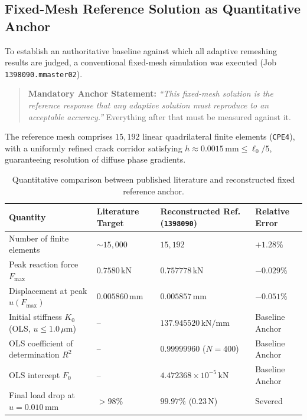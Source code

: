 \subsection{Fixed-Mesh Reference Solution as Quantitative Anchor}
To establish an authoritative baseline against which all adaptive remeshing results are judged, a conventional fixed-mesh simulation was executed (Job \texttt{1398090.mmaster02}). 

\begin{quote}
\textbf{Mandatory Anchor Statement:} \emph{``This fixed-mesh solution is the reference response that any adaptive solution must reproduce to an acceptable accuracy.''} Everything after that must be measured against it.
\end{quote}

The reference mesh comprises $15{,}192$ linear quadrilateral finite elements (\texttt{CPE4}), with a uniformly refined crack corridor satisfying $h \approx 0.0015\,\mathrm{mm} \le \ell_0 / 5$, guaranteeing resolution of diffuse phase gradients. 

\begin{table}[htbp]
  \centering
  \footnotesize
  \caption{Quantitative comparison between published literature and reconstructed fixed reference anchor.}
  \label{tab:reference_anchor}
  \begin{tabularx}{\textwidth}{L{46mm} C{28mm} C{28mm} C{24mm}}
    \toprule
    \textbf{Quantity} & \textbf{Literature Target} \citep{Pandey2025} & \textbf{Reconstructed Ref.} (\texttt{1398090}) & \textbf{Relative Error} \\
    \midrule
    Number of finite elements & $\sim 15{,}000$ & $15{,}192$ & $+1.28\%$ \\
    Peak reaction force $F_{\max}$ & $0.7580\,\mathrm{kN}$ & $0.757778\,\mathrm{kN}$ & $-0.029\%$ \\
    Displacement at peak $u(F_{\max})$ & $0.005860\,\mathrm{mm}$ & $0.005857\,\mathrm{mm}$ & $-0.051\%$ \\
    Initial stiffness $K_0$ (OLS, $u \le 1.0\,\mu\mathrm{m}$) & -- & $137.945520\,\mathrm{kN/mm}$ & Baseline Anchor \\
    OLS coefficient of determination $R^2$ & -- & $0.99999960$ ($N=400$) & Baseline Anchor \\
    OLS intercept $F_0$ & -- & $4.472368 \times 10^{-5}\,\mathrm{kN}$ & Baseline Anchor \\
    Final load drop at $u = 0.010\,\mathrm{mm}$ & $>98\%$ & $99.97\%$ ($0.23\,\mathrm{N}$) & Severed \\
    \bottomrule
  \end{tabularx}
\end{table}

